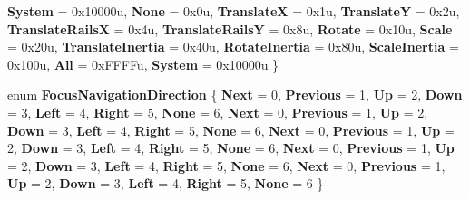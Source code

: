 \begin{DoxyCompactItemize}
{\bfseries System} = 0x10000u, 
\newline
{\bfseries None} = 0x0u, 
{\bfseries TranslateX} = 0x1u, 
{\bfseries TranslateY} = 0x2u, 
{\bfseries Translate\+RailsX} = 0x4u, 
\newline
{\bfseries Translate\+RailsY} = 0x8u, 
{\bfseries Rotate} = 0x10u, 
{\bfseries Scale} = 0x20u, 
{\bfseries Translate\+Inertia} = 0x40u, 
\newline
{\bfseries Rotate\+Inertia} = 0x80u, 
{\bfseries Scale\+Inertia} = 0x100u, 
{\bfseries All} = 0x\+F\+F\+F\+Fu, 
{\bfseries System} = 0x10000u
 \}
\item 
\mbox{\label{namespace_windows_1_1_u_i_1_1_xaml_1_1_input_a79a24b7b4f6dcfda601ea71a4020fd05}} 
enum {\bfseries Focus\+Navigation\+Direction} \{ \newline
{\bfseries Next} = 0, 
{\bfseries Previous} = 1, 
{\bfseries Up} = 2, 
{\bfseries Down} = 3, 
\newline
{\bfseries Left} = 4, 
{\bfseries Right} = 5, 
{\bfseries None} = 6, 
{\bfseries Next} = 0, 
\newline
{\bfseries Previous} = 1, 
{\bfseries Up} = 2, 
{\bfseries Down} = 3, 
{\bfseries Left} = 4, 
\newline
{\bfseries Right} = 5, 
{\bfseries None} = 6, 
{\bfseries Next} = 0, 
{\bfseries Previous} = 1, 
\newline
{\bfseries Up} = 2, 
{\bfseries Down} = 3, 
{\bfseries Left} = 4, 
{\bfseries Right} = 5, 
\newline
{\bfseries None} = 6, 
{\bfseries Next} = 0, 
{\bfseries Previous} = 1, 
{\bfseries Up} = 2, 
\newline
{\bfseries Down} = 3, 
{\bfseries Left} = 4, 
{\bfseries Right} = 5, 
{\bfseries None} = 6, 
\newline
{\bfseries Next} = 0, 
{\bfseries Previous} = 1, 
{\bfseries Up} = 2, 
{\bfseries Down} = 3, 
\newline
{\bfseries Left} = 4, 
{\bfseries Right} = 5, 
{\bfseries None} = 6
 \}
\end{DoxyCompactItemize}
